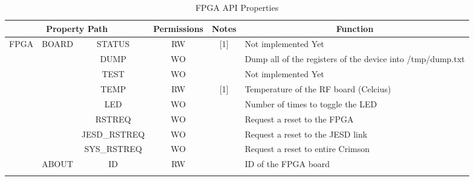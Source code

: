 \documentclass[11pt]{article}
\begin{document}
{\begin{landscape}
\begin{table}[H]
\centering
\small
\caption{FPGA API Properties}
\label{table:fpga-api}
\begin{tabular}{|c|c|c|c|c|c|l|}
\hline
\multicolumn{4}{|c|}{{\bf Property Path}}                                             & {\bf Permissions} & {\bf Notes} & \multicolumn{1}{c|}{{\bf Function}}                                   \\ \hline
\multirow{25}{*}{FPGA} & \multirow{8}{*}{BOARD}  & \multicolumn{2}{c|}{STATUS}        & RW                & [1]         & Not implemented Yet                                                   \\ \cline{3-7} 
                       &                         & \multicolumn{2}{c|}{DUMP}          & WO                &             & Dump all of the registers of the device into /tmp/dump.txt            \\ \cline{3-7} 
                       &                         & \multicolumn{2}{c|}{TEST}          & WO                &             & Not implemented Yet                                                   \\ \cline{3-7} 
                       &                         & \multicolumn{2}{c|}{TEMP}          & RW                & [1]         & Temperature of the RF board (Celcius)                                 \\ \cline{3-7} 
                       &                         & \multicolumn{2}{c|}{LED}           & WO                &             & Number of times to toggle the LED                                     \\ \cline{3-7} 
                       &                         & \multicolumn{2}{c|}{RSTREQ}        & WO                &             & Request a reset to the FPGA                                           \\ \cline{3-7} 
                       &                         & \multicolumn{2}{c|}{JESD\_RSTREQ}  & WO                &             & Request a reset to the JESD link                                      \\ \cline{3-7} 
                       &                         & \multicolumn{2}{c|}{SYS\_RSTREQ}   & WO                &             & Request a reset to entire Crimson                                     \\ \cline{2-7} 
                       & \multirow{5}{*}{ABOUT}  & \multicolumn{2}{c|}{ID}            & RW                &             & ID of the FPGA board                                                  \\ \cline{3-7} 

\end{tabular}
\end{table}
\end{landscape}}
\end{document}
